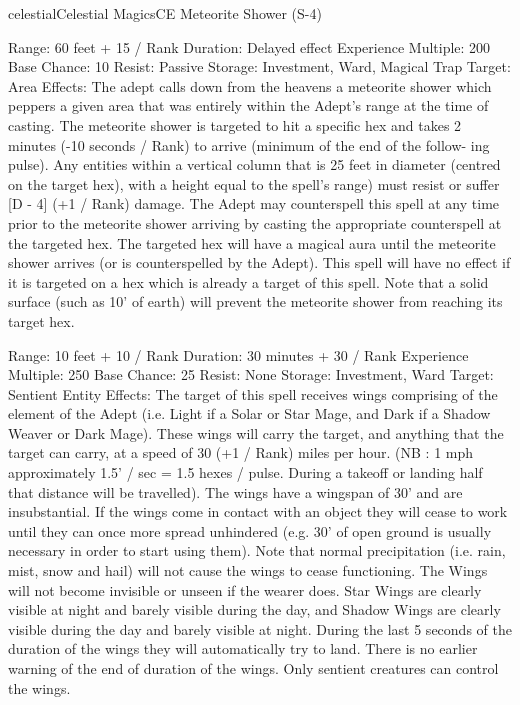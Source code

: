 \begin{College}[1.3]{celestial}{Celestial Magics}{CE}
Meteorite Shower (S-4) 

Range: 60 feet + 15 / Rank 
Duration: Delayed effect 
Experience Multiple: 200 
Base Chance: 10%
Resist: Passive 
Storage: Investment, Ward, Magical Trap 
Target: Area 
Effects:  The  adept  calls  down  from  the  heavens  a 
meteorite  shower  which  peppers  a  given  area  that 
was entirely within the Adept’s range at the time of 
casting.  The  meteorite  shower  is  targeted  to  hit  a 
specific  hex  and  takes  2  minutes  (-10  seconds  / 
Rank) to arrive (minimum of the end of the follow-
ing  pulse).  Any  entities  within  a  vertical  column 
that  is  25  feet  in  diameter  (centred  on  the  target 
hex), with a height equal to the spell’s range) must 
resist  or  suffer  [D  -  4]  (+1  /  Rank)  damage.  The 
Adept may counterspell this spell at any time prior 
to  the  meteorite  shower  arriving  by  casting  the 
appropriate  counterspell  at  the  targeted  hex.  The 
targeted  hex  will  have  a  magical  aura  until  the 
meteorite  shower  arrives  (or  is  counterspelled  by 
the  Adept).  This  spell  will  have  no  effect  if  it  is 
targeted  on  a  hex  which  is  already  a  target  of  this 
spell.  Note  that  a  solid  surface  (such  as  10’  of 
earth)  will  prevent  the  meteorite  shower  from 
reaching its target hex. 

Range: 10 feet + 10 / Rank 
Duration: 30 minutes + 30 / Rank 
Experience Multiple: 250 
Base Chance: 25%
Resist: None 
Storage: Investment, Ward 
Target: Sentient Entity 
Effects:  The  target  of  this  spell  receives  wings 
comprising  of  the  element  of  the  Adept  (i.e.  Light 
if  a  Solar  or  Star  Mage,  and  Dark  if  a  Shadow 
Weaver or Dark Mage). These wings will carry the 
target,  and  anything  that  the  target  can  carry,  at  a 
speed  of  30  (+1  /  Rank)  miles  per  hour.  (NB  :  1 
mph  approximately  1.5’  /  sec  =  1.5  hexes  /  pulse. 
During  a  takeoff  or  landing  half  that  distance  will 
be  travelled).  The  wings  have  a  wingspan  of  30’ 
and are insubstantial. If the wings come in contact 
with  an  object  they  will  cease  to  work  until  they 
can once more spread unhindered (e.g. 30’ of open 
ground  is  usually  necessary  in  order  to  start  using 
them).  Note  that  normal  precipitation  (i.e.  rain, 
mist,  snow  and  hail)  will  not  cause  the  wings  to 
cease  functioning.  The  Wings  will  not  become 
invisible  or  unseen  if the  wearer  does.  Star Wings 
are clearly visible at night and barely visible during 
the  day,  and  Shadow  Wings  are  clearly  visible 
during  the  day  and  barely  visible  at  night.  During 
the last 5 seconds of the duration of the wings they 
will  automatically  try  to  land.  There  is  no  earlier 
warning of the end of duration of the  wings. Only 
sentient creatures can control the wings. 


\end{College}
